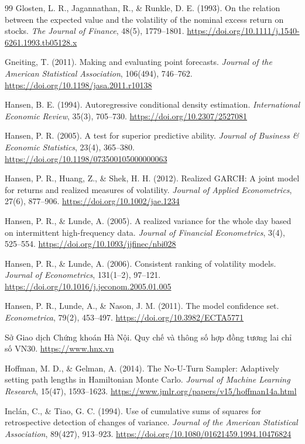 \documentclass[12pt,a4paper]{article}
\theoremstyle{definition}
\theoremstyle{remark}
\begin{document}
\begin{thebibliography}{99}
 Glosten, L. R., Jagannathan, R., \& Runkle, D. E. (1993). On the relation between the expected value and the volatility of the nominal excess return on stocks. \emph{The Journal of Finance}, 48(5), 1779--1801. \url{https://doi.org/10.1111/j.1540-6261.1993.tb05128.x}

 Gneiting, T. (2011). Making and evaluating point forecasts. \emph{Journal of the American Statistical Association}, 106(494), 746--762. \url{https://doi.org/10.1198/jasa.2011.r10138}

 Hansen, B. E. (1994). Autoregressive conditional density estimation. \emph{International Economic Review}, 35(3), 705--730. \url{https://doi.org/10.2307/2527081}

 Hansen, P. R. (2005). A test for superior predictive ability. \emph{Journal of Business \& Economic Statistics}, 23(4), 365--380. \url{https://doi.org/10.1198/073500105000000063}

 Hansen, P. R., Huang, Z., \& Shek, H. H. (2012). Realized GARCH: A joint model for returns and realized measures of volatility. \emph{Journal of Applied Econometrics}, 27(6), 877--906. \url{https://doi.org/10.1002/jae.1234}

 Hansen, P. R., \& Lunde, A. (2005). A realized variance for the whole day based on intermittent high-frequency data. \emph{Journal of Financial Econometrics}, 3(4), 525--554. \url{https://doi.org/10.1093/jjfinec/nbi028}

 Hansen, P. R., \& Lunde, A. (2006). Consistent ranking of volatility models. \emph{Journal of Econometrics}, 131(1--2), 97--121. \url{https://doi.org/10.1016/j.jeconom.2005.01.005}

 Hansen, P. R., Lunde, A., \& Nason, J. M. (2011). The model confidence set. \emph{Econometrica}, 79(2), 453--497. \url{https://doi.org/10.3982/ECTA5771}

 Sở Giao dịch Chứng khoán Hà Nội. Quy chế và thông số hợp đồng tương lai chỉ số VN30. \url{https://www.hnx.vn}

 Hoffman, M. D., \& Gelman, A. (2014). The No-U-Turn Sampler: Adaptively setting path lengths in Hamiltonian Monte Carlo. \emph{Journal of Machine Learning Research}, 15(47), 1593--1623. \url{https://www.jmlr.org/papers/v15/hoffman14a.html}

 Inclán, C., \& Tiao, G. C. (1994). Use of cumulative sums of squares for retrospective detection of changes of variance. \emph{Journal of the American Statistical Association}, 89(427), 913--923. \url{https://doi.org/10.1080/01621459.1994.10476824}


\end{thebibliography}
\end{document}
